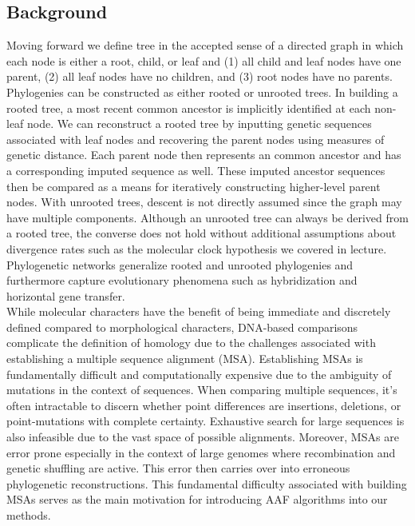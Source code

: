 \documentclass[a4paper]{article}
\begin{document}
\begin{multicols}{2}
\section{Background}
Moving forward we define tree in the accepted sense of a directed graph in which each node is either a root, child, or leaf and (1) all child and leaf nodes have one parent, (2) all leaf nodes have no children, and (3) root nodes have no parents. Phylogenies can be constructed as either rooted or unrooted trees. In building a rooted tree, a most recent common ancestor is implicitly identified at each non-leaf node. We can reconstruct a rooted tree by inputting genetic sequences associated with leaf nodes and recovering the parent nodes using measures of genetic distance. Each parent node then represents an common ancestor and has a corresponding imputed sequence as well. These imputed ancestor sequences then be compared as a means for iteratively constructing higher-level parent nodes. With unrooted trees, descent is not directly assumed since the graph may have multiple components. Although an unrooted tree can always be derived from a rooted tree, the converse does not hold without additional assumptions about divergence rates such as the molecular clock hypothesis we covered in lecture. Phylogenetic networks generalize rooted and unrooted phylogenies and furthermore capture evolutionary phenomena such as hybridization and horizontal gene transfer. \\

While molecular characters have the benefit of being immediate and discretely defined compared to morphological characters, DNA-based comparisons complicate the definition of homology due to the challenges associated with establishing a multiple sequence alignment (MSA). Establishing MSAs is fundamentally difficult and computationally expensive due to the ambiguity of mutations in the context of sequences. When comparing multiple sequences, it's often intractable to discern whether point differences are insertions, deletions, or point-mutations with complete certainty. Exhaustive search for large sequences is also infeasible due to the vast space of possible alignments. Moreover, MSAs are error prone especially in the context of large genomes where recombination and genetic shuffling are active. This error then carries over into erroneous phylogenetic reconstructions. This fundamental difficulty associated with building MSAs serves as the main motivation for introducing AAF algorithms into our methods.


\end{multicols}
\end{document}
